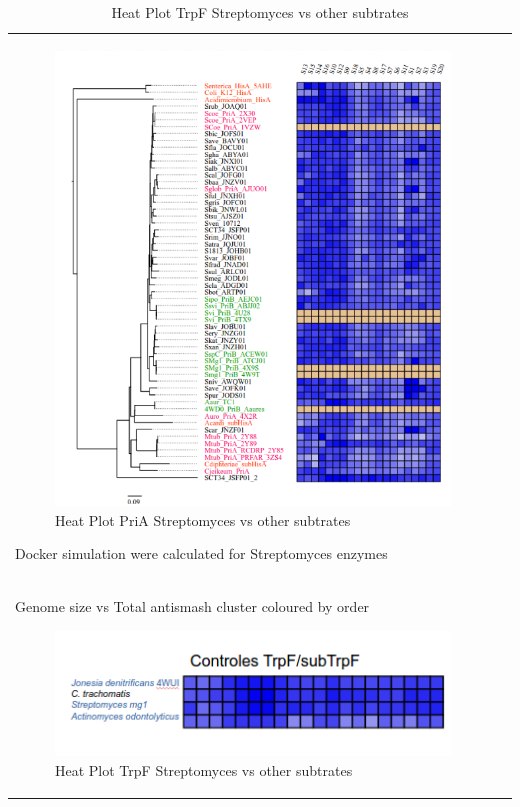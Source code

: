 \documentclass[12pt,twoside]{reedthesis}
\begin{document}
\begin{longtable}[c]{@{}lr@{}}
  \begin{figure}[h!tbp]
  \centering
  \includegraphics[angle = 0,scale = 0.6]{chapter2/PriAHeatPot.png}
  \caption[Heat Plot PriA Streptomyces vs other subtrates]{\normalsize{Heat Plot PriA Streptomyces vs other subtrates}}
  \label{fig:PriADocking}
  \end{figure}
  
  Docker simulation were calculated for Streptomyces enzymes\\
  Genome size vs Total antismash cluster coloured by order
  
  \begin{figure}[h!tbp]
  \centering
  \includegraphics[angle = 0,scale = 0.6]{chapter2/TrpFHeatPlot.png}
  \caption[Heat Plot TrpF Streptomyces vs other subtrates]{\normalsize{Heat Plot TrpF Streptomyces vs other subtrates}}
  \label{fig:TrpFDocking}
  \end{figure}
  

\end{longtable}
\end{document}
